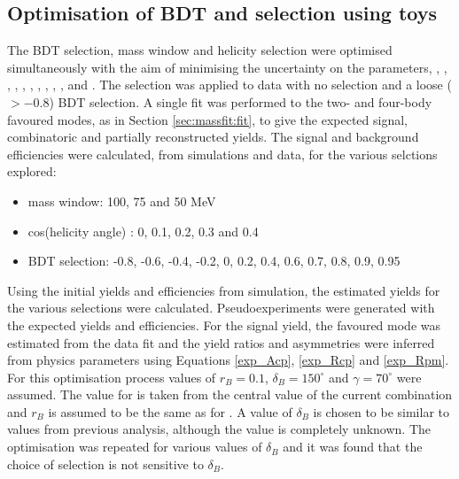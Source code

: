 \subsection{Optimisation of BDT and \Kstar selection using toys}
\label{sec:cpfit:optimisation}

The BDT selection, \Kstar mass window and \KS helicity selection were optimised simultaneously with the aim of minimising the uncertainty on the \CP parameters, \Akpi, \Akk, \Apipi, \Rkk, \Rpipi, \Rptwo, \Rmtwo, \Akpipipi, \Apipipipi, \Rpipipipi, \Rpfour and \Rmfour. The selection was applied to data with no \Kstar selection and a loose ($>-0.8$) BDT selection. A single fit was performed to the two- and four-body favoured modes, as in Section \ref{sec:massfit:fit}, to give the expected signal, combinatoric and partially reconstructed yields. The signal and background efficiencies were calculated, from simulations and data, for the various selctions explored:

\begin{itemize}
\item{\Kstar mass window: 100, 75 and 50 MeV}
\item{\textbar cos(\KS helicity angle) \textbar : 0, 0.1, 0.2, 0.3 and 0.4}
\item{BDT selection: -0.8, -0.6, -0.4, -0.2, 0, 0.2, 0.4, 0.6, 0.7, 0.8, 0.9, 0.95}
\end{itemize}

Using the initial yields and efficiencies from simulation, the estimated yields for the various selections were calculated. Pseudoexperiments were generated with the expected yields and efficiencies. For the signal yield, the favoured mode was estimated from the data fit and the yield ratios and asymmetries were inferred from physics parameters using Equations \ref{exp_Acp}, \ref{exp_Rcp} and \ref{exp_Rpm}. For this optimisation process values of $r_B = 0.1$, $\delta_B = 150^{\circ}$ and $\gamma = 70^{\circ}$ were assumed. The value for \Pgamma is taken from the central value of the current \lhcb combination and $r_B$ is assumed to be the same as for \decay{\B}{\D\kaon}. A value of $\delta_B$ is chosen to be similar to values from previous analysis, although the value is completely unknown. The optimisation was repeated for various values of $\delta_B$ and it was found that the choice of selection is not sensitive to $\delta_B$.

